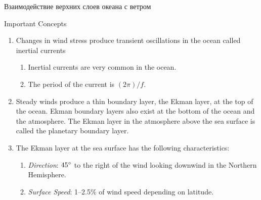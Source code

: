 \begin{chapter}{Взаимодействие верхних слоев океана с ветром}
\begin{section}{Important Concepts}
\begin{enumerate}
\item
Changes in wind stress produce
transient oscillations in the ocean called inertial
currents
%
%
\begin{enumerate}
\item 
Inertial currents are very common in the ocean.
%

\item 
The period of the current is $(2 \pi)/f$.
%
\end{enumerate}

\item Steady winds produce a thin boundary layer, the Ekman layer, at
the top of the ocean. Ekman boundary layers also exist at the bottom
of the ocean and the atmosphere.  The Ekman layer in the atmosphere
above the sea surface is called the planetary boundary layer.
%

\item 
The Ekman layer at the sea
surface has the following characteristics:
%
%
\begin{enumerate}
\item 
\textit{Direction}: ${45}^\circ$ to the right of the wind looking
downwind in the Northern Hemisphere.
%

\item 
\textit{Surface Speed}: 1--2.5\% of wind speed depending on
latitude.
%


\end{enumerate}
\end{enumerate}
\end{section}
\end{chapter}
